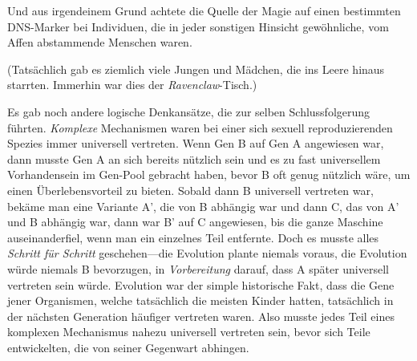Und aus irgendeinem Grund achtete die Quelle der Magie auf einen bestimmten DNS-Marker bei Individuen, die in jeder sonstigen Hinsicht gewöhnliche, vom Affen abstammende Menschen waren.

(Tatsächlich gab es ziemlich viele Jungen und Mädchen, die ins Leere hinaus starrten. Immerhin war dies der \emph{Ravenclaw}-Tisch.)

Es gab noch andere logische Denkansätze, die zur selben Schlussfolgerung führten. \emph{Komplexe} Mechanismen waren bei einer sich sexuell reproduzierenden Spezies immer universell vertreten. Wenn Gen B auf Gen A angewiesen war, dann musste Gen A an sich bereits nützlich sein und es zu fast universellem Vorhandensein im Gen-Pool gebracht haben, bevor B oft genug nützlich wäre, um einen Überlebensvorteil zu bieten. Sobald dann B universell vertreten war, bekäme man eine Variante A’, die von B abhängig war und dann C, das von A’ und B abhängig war, dann war B’ auf C angewiesen, bis die ganze Maschine auseinanderfiel, wenn man ein einzelnes Teil entfernte. Doch es musste alles \emph{Schritt für Schritt} geschehen—die Evolution plante niemals voraus, die Evolution würde niemals B bevorzugen, in \emph{Vorbereitung} darauf, dass A später universell vertreten sein würde. Evolution war der simple historische Fakt, dass die Gene jener Organismen, welche tatsächlich die meisten Kinder hatten, tatsächlich in der nächsten Generation häufiger vertreten waren. Also musste jedes Teil eines komplexen Mechanismus nahezu universell vertreten sein, bevor sich Teile entwickelten, die von seiner Gegenwart abhingen.

